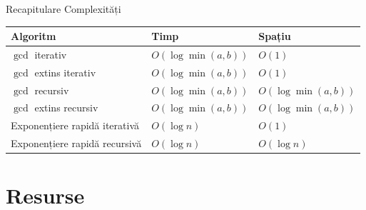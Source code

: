 \documentclass{beamer}
\begin{document}
\begin{frame}{Recapitulare \textemdash{} Complexități}
  \begin{center}
  \begin{tabular}{lll}
    \toprule
    Algoritm & Timp & Spațiu \\
    \midrule
    $\gcd$ iterativ                & $O(\log \min(a,b))$ & $O(1)$ \\
    $\gcd$ extins iterativ         & $O(\log \min(a,b))$ & $O(1)$ \\
    $\gcd$ recursiv                & $O(\log \min(a,b))$ & $O(\log \min(a,b))$ \\
    $\gcd$ extins recursiv         & $O(\log \min(a,b))$ & $O(\log \min(a,b))$ \\
    Exponențiere rapidă iterativă  & $O(\log n)$         & $O(1)$ \\
    Exponențiere rapidă recursivă  & $O(\log n)$         & $O(\log n)$ \\
    \bottomrule
  \end{tabular}
  \end{center}
\end{frame}

\section{Resurse}
\end{document}

